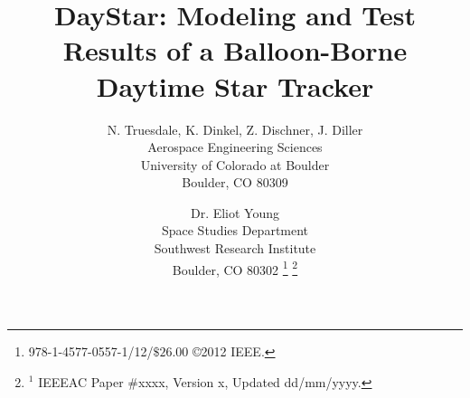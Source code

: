 \documentclass[twocolumn,letterpaper]{IEEEAerospace2012}
\begin{document}
\title{DayStar: Modeling and Test Results of a Balloon-Borne Daytime Star Tracker}

\author{%
    N. Truesdale, K. Dinkel, Z. Dischner, J. Diller \\
    Aerospace Engineering Sciences\\
    University of Colorado at Boulder\\
    Boulder, CO 80309\\
    \and
    Dr. Eliot Young\\
    Space Studies Department\\
    Southwest Research Institute\\
    Boulder, CO 80302
    \thanks{\footnotesize 978-1-4577-0557-1/12/$\$26.00$ \copyright2012 IEEE.}              %
    \thanks{$^1$ IEEEAC Paper \#xxxx, Version x, Updated dd/mm/yyyy.} %
}


\maketitle
\end{document}
